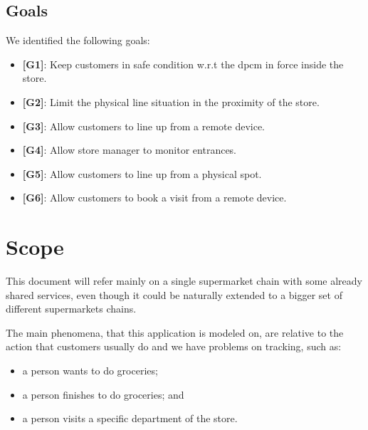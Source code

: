\subsection{Goals}

We identified the following goals:

\begin{itemize}

	\item {\textbf{[G1]}}: Keep customers in safe condition w.r.t the \gls{dpcm} in force inside the store.
		
	\item {\textbf{[G2]}}: Limit the physical line situation in the proximity of the store.
		
	\item {\textbf{[G3]}}: Allow customers to line up from a remote device.
	
	\item {\textbf{[G4]}}: Allow store manager to monitor entrances.
	
	\item {\textbf{[G5]}}: Allow customers to line up from a physical spot.
	
	\item {\textbf{[G6]}}: Allow customers to book a visit from a remote
device.

\end{itemize}

\section{Scope}

This document will refer mainly on a single supermarket chain with some already shared services, even though it could be naturally extended to a bigger set of different supermarkets chains.

The main phenomena, that this application is modeled on, are relative to the action that customers usually do and we have problems on tracking, such as:
\begin{itemize}
	\item a person wants to do groceries;
	\item a person finishes to do groceries; and
	\item a person visits a specific department of the store.
\end{itemize}

